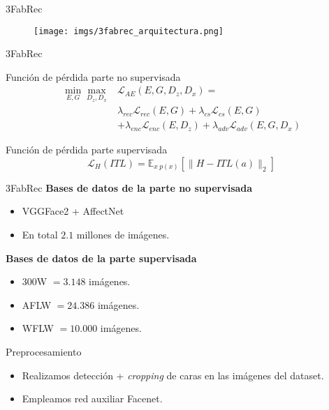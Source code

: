 \documentclass[aspectratio=43]{beamer}
\begin{document}
\begin{frame}{3FabRec}
  \begin{figure}
    \centering
    \texttt{[image: imgs/3fabrec\_arquitectura.png]}
  \end{figure}
\end{frame}

\begin{frame}{3FabRec}
  \begin{block}{Función de pérdida parte no supervisada}
    \begin{align*}
      \min_{E,G} \max_{D_z,D_x} & \mathcal{L}_{AE}(E,G,D_z,D_x) = \\
      & \lambda_{rec} \mathcal{L}_{rec}(E,G) + \lambda_{cs}\mathcal{L}_{cs}(E,G) \\
      & + \lambda_{enc}\mathcal{L}_{enc}(E,D_z)+ \lambda_{adv} \mathcal{L}_{adv}(E,G,D_x)
    \end{align*}
  \end{block}
  \begin{block}{Función de pérdida parte supervisada}
    \begin{equation*}
      \mathcal{L}_H(ITL) = \mathbb{E}_{x ~ p(x)} \left[ \| H-ITL(a)\|_2 \right]
    \end{equation*}
  \end{block}
\end{frame}

\begin{frame}{3FabRec}
  \textcolor{tudCyan}{\textbf{Bases de datos de la parte no supervisada}}
  \begin{itemize}
    \item VGGFace2 + AffectNet
    \item En total $2.1$ millones de imágenes.
  \end{itemize}
  \textcolor{tudCyan}{\textbf{Bases de datos de la parte supervisada}}
  \begin{itemize}
    \item 300W $= 3.148$ imágenes.
    \item AFLW $= 24.386$ imágenes.
    \item WFLW $= 10.000$ imágenes.
  \end{itemize}
\end{frame}

\begin{frame}{Preprocesamiento}
  \begin{itemize}
    \item Realizamos detección + \textit{cropping} de caras en las imágenes del dataset.
    \item Empleamos red auxiliar \textcolor{tudCyan}{Facenet}.
  \end{itemize}
\end{frame}
\end{document}
